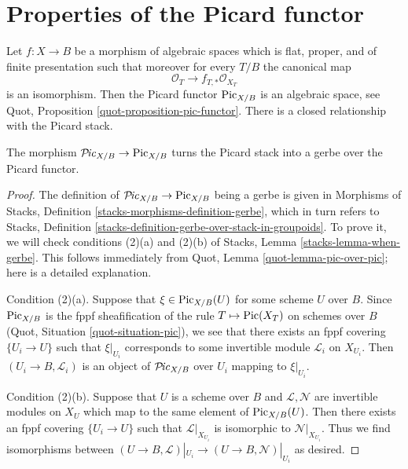 \section{Properties of the Picard functor}
\label{section-picard-functor}

\noindent
Let $f : X \to B$ be a morphism of algebraic spaces which is flat,
proper, and of finite presentation such that moreover for every $T/B$
the canonical map
$$
\mathcal{O}_T \longrightarrow f_{T, *}\mathcal{O}_{X_T}
$$
is an isomorphism. Then the Picard functor $\mathrm{Pic}_{X/B}$ is an
algebraic space, see Quot, Proposition \ref{quot-proposition-pic-functor}.
There is a closed relationship with the Picard stack.

\begin{lemma}
\label{lemma-pic-gerbe-over-pic-functor}
The morphism $\mathcal{P}\!\mathit{ic}_{X/B} \to \mathrm{Pic}_{X/B}$
turns the Picard stack into a gerbe over the Picard functor.
\end{lemma}

\begin{proof}
The definition of $\mathcal{P}\!\mathit{ic}_{X/B} \to \mathrm{Pic}_{X/B}$ being
a gerbe is given in Morphisms of Stacks, Definition
\ref{stacks-morphisms-definition-gerbe}, which in turn refers to
Stacks, Definition \ref{stacks-definition-gerbe-over-stack-in-groupoids}.
To prove it, we will check conditions (2)(a) and (2)(b) of
Stacks, Lemma \ref{stacks-lemma-when-gerbe}. This follows immediately from
Quot, Lemma \ref{quot-lemma-pic-over-pic}; here is a detailed explanation.

\medskip\noindent
Condition (2)(a).
Suppose that $\xi \in \mathrm{Pic}_{X/B}(U)$ for some scheme $U$ over $B$.
Since $\mathrm{Pic}_{X/B}$ is the fppf sheafification of the rule
$T \mapsto \mathop{\mathrm{Pic}}\nolimits(X_T)$ on schemes over $B$
(Quot, Situation \ref{quot-situation-pic}), we see that there exists an
fppf covering $\{U_i \to U\}$ such that $\xi|_{U_i}$ corresponds
to some invertible module $\mathcal{L}_i$ on $X_{U_i}$.
Then $(U_i \to B, \mathcal{L}_i)$ is an object of
$\mathcal{P}\!\mathit{ic}_{X/B}$ over $U_i$ mapping to $\xi|_{U_i}$.

\medskip\noindent
Condition (2)(b). Suppose that $U$ is a scheme over $B$ and
$\mathcal{L}, \mathcal{N}$ are invertible modules on $X_U$
which map to the same element of $\mathrm{Pic}_{X/B}(U)$.
Then there exists an fppf covering $\{U_i \to U\}$
such that $\mathcal{L}|_{X_{U_i}}$ is isomorphic to $\mathcal{N}|_{X_{U_i}}$.
Thus we find isomorphisms between
$(U \to B, \mathcal{L})|_{U_i} \to (U \to B, \mathcal{N})|_{U_i}$
as desired.
\end{proof}

